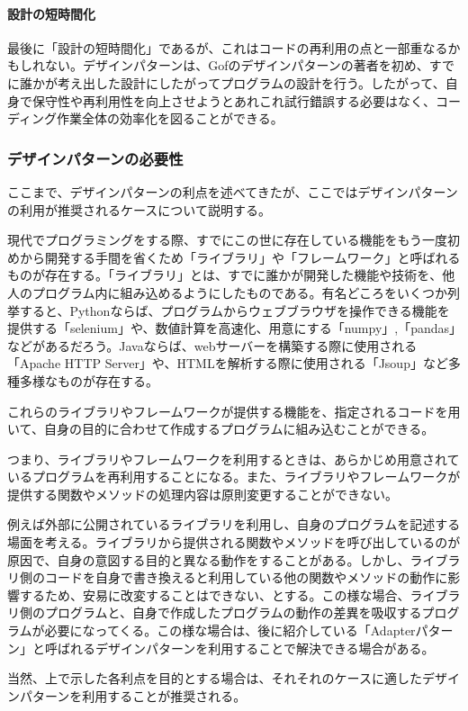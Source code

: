 \documentclass[dvipdfmx]{jsarticle}
\begin{document}
\paragraph{設計の短時間化}最後に「設計の短時間化」であるが、これはコードの再利用の点と一部重なるかもしれない。デザインパターンは、Gofのデザインパターンの著者を初め、すでに誰かが考え出した設計にしたがってプログラムの設計を行う。したがって、自身で保守性や再利用性を向上させようとあれこれ試行錯誤する必要はなく、コーディング作業全体の効率化を図ることができる。
\subsubsection{デザインパターンの必要性}
ここまで、デザインパターンの利点を述べてきたが、ここではデザインパターンの利用が推奨されるケースについて説明する。\par
現代でプログラミングをする際、すでにこの世に存在している機能をもう一度初めから開発する手間を省くため「ライブラリ」や「フレームワーク」と呼ばれるものが存在する。「ライブラリ」とは、すでに誰かが開発した機能や技術を、他人のプログラム内に組み込めるようにしたものである。有名どころをいくつか列挙すると、Pythonならば、プログラムからウェブブラウザを操作できる機能を提供する「selenium」や、数値計算を高速化、用意にする「numpy」,「pandas」などがあるだろう。Javaならば、webサーバーを構築する際に使用される「Apache HTTP Server」や、HTMLを解析する際に使用される「Jsoup」など多種多様なものが存在する。\par
これらのライブラリやフレームワークが提供する機能を、指定されるコードを用いて、自身の目的に合わせて作成するプログラムに組み込むことができる。\par
つまり、ライブラリやフレームワークを利用するときは、あらかじめ用意されているプログラムを再利用することになる。また、ライブラリやフレームワークが提供する関数やメソッドの処理内容は原則変更することができない。\par
例えば外部に公開されているライブラリを利用し、自身のプログラムを記述する場面を考える。ライブラリから提供される関数やメソッドを呼び出しているのが原因で、自身の意図する目的と異なる動作をすることがある。しかし、ライブラリ側のコードを自身で書き換えると利用している他の関数やメソッドの動作に影響するため、安易に改変することはできない、とする。この様な場合、ライブラリ側のプログラムと、自身で作成したプログラムの動作の差異を吸収するプログラムが必要になってくる。この様な場合は、後に紹介している「Adapterパターン」と呼ばれるデザインパターンを利用することで解決できる場合がある。\par
当然、上で示した各利点を目的とする場合は、それそれのケースに適したデザインパターンを利用することが推奨される。
\end{document}
